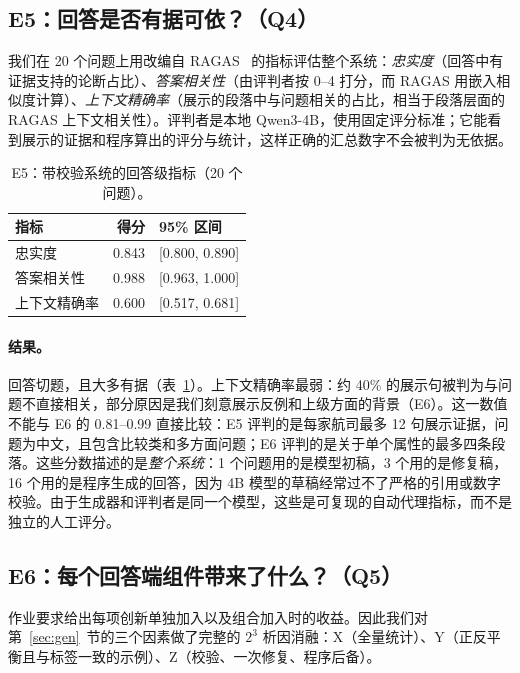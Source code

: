 \documentclass[10pt,twocolumn,a4paper]{article}
\newcommand{\sref}[1]{第~\ref{#1}~节}
\begin{document}
\subsection{E5：回答是否有据可依？（Q4）}
\label{sec:exp-rag}

我们在 20 个问题上用改编自 RAGAS~\cite{ragas} 的指标评估整个系统：\emph{忠实度}（回答中有证据支持的论断占比）、\emph{答案相关性}（由评判者按 0--4 打分，而 RAGAS 用嵌入相似度计算）、\emph{上下文精确率}（展示的段落中与问题相关的占比，相当于段落层面的 RAGAS 上下文相关性）。评判者是本地 Qwen3-4B，使用固定评分标准；它能看到展示的证据和程序算出的评分与统计，这样正确的汇总数字不会被判为无依据。

\begin{table}[t]
\centering\small
\caption{E5：带校验系统的回答级指标（20 个问题）。}
\label{tab:rag}
\begin{tabular}{@{}lrl@{}}
\toprule
\textbf{指标} & \textbf{得分} & \textbf{95\% 区间} \\
\midrule
忠实度 & 0.843 & [0.800, 0.890] \\
答案相关性 & 0.988 & [0.963, 1.000] \\
上下文精确率 & 0.600 & [0.517, 0.681] \\
\bottomrule
\end{tabular}
\end{table}

\paragraph{结果。}回答切题，且大多有据（表~\ref{tab:rag}）。上下文精确率最弱：约 40\% 的展示句被判为与问题不直接相关，部分原因是我们刻意展示反例和上级方面的背景（E6）。这一数值不能与 E6 的 0.81--0.99 直接比较：E5 评判的是每家航司最多 12 句展示证据，问题为中文，且包含比较类和多方面问题；E6 评判的是关于单个属性的最多四条段落。这些分数描述的是\emph{整个系统}：1 个问题用的是模型初稿，3 个用的是修复稿，16 个用的是程序生成的回答，因为 4B 模型的草稿经常过不了严格的引用或数字校验。由于生成器和评判者是同一个模型，这些是可复现的自动代理指标，而不是独立的人工评分。

\subsection{E6：每个回答端组件带来了什么？（Q5）}
\label{sec:exp-abl}

作业要求给出每项创新单独加入以及组合加入时的收益。因此我们对\sref{sec:gen}的三个因素做了完整的 $2^3$ 析因消融：X（全量统计）、Y（正反平衡且与标签一致的示例）、Z（校验、一次修复、程序后备）。
\end{document}
